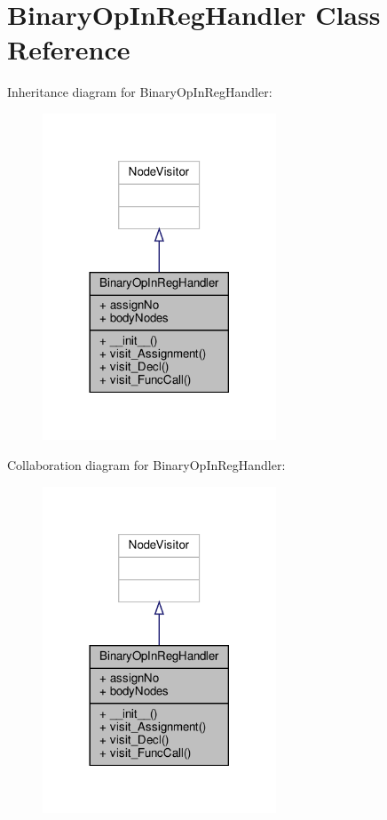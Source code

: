 \hypertarget{classPostProcessor_1_1Visitor_1_1BinaryOpInRegHandler}{}\section{Binary\+Op\+In\+Reg\+Handler Class Reference}
\label{classPostProcessor_1_1Visitor_1_1BinaryOpInRegHandler}


Inheritance diagram for Binary\+Op\+In\+Reg\+Handler\+:\nopagebreak
\begin{figure}[H]
\begin{center}
\leavevmode
\includegraphics[width=197pt]{classPostProcessor_1_1Visitor_1_1BinaryOpInRegHandler__inherit__graph}
\end{center}
\end{figure}


Collaboration diagram for Binary\+Op\+In\+Reg\+Handler\+:\nopagebreak
\begin{figure}[H]
\begin{center}
\leavevmode
\includegraphics[width=197pt]{classPostProcessor_1_1Visitor_1_1BinaryOpInRegHandler__coll__graph}
\end{center}
\end{figure}
